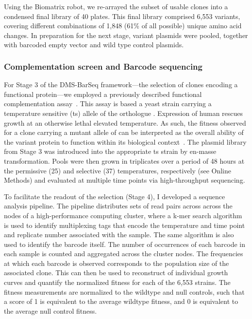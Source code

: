 Using the Biomatrix robot, we re-arrayed the subset of usable clones into a condensed final library of 40 plates. This final library comprised 6,553  variants, covering different combinations of 1,848 (61\% of all possible) unique amino acid changes. In preparation for the next stage, variant plasmids were pooled, together with barcoded empty vector and wild type control plasmids.



\subsubsection{Complementation screen and Barcode sequencing}

For Stage 3 of the DMS-BarSeq framework---the selection of clones encoding a functional protein---we employed a previously described  functional complementation assay~\cite{lee_complementation_1987,osborn_rescuing_2007}. This assay is based a yeast strain carrying a temperature sensitive (ts) allele of the  orthologue . Expression of human  rescues growth at an otherwise lethal elevated temperature. As such, the fitness observed for a clone carrying a mutant allele of  can be interpreted as the overall ability of the variant protein to function within its biological context~\cite{sun_extended_2016}. 
The plasmid library from Stage 3 was introduced into the appropriate ts strain by en-masse transformation. Pools were then grown in triplicates over a period of 48 hours at the permissive (25\celsius ) and selective (37\celsius ) temperatures, respectively (see Online Methods) and evaluated at multiple time points via high-throughput sequencing.

To facilitate the readout of the selection (Stage 4), I developed a sequence analysis pipeline. The pipeline distributes sets of read pairs across across the nodes of a high-performance computing cluster, where a k-mer search algorithm is used to identify multiplexing tags that encode the temperature and time point and replicate number associated with the sample. The same algorithm is also used to identify the barcode itself. The number of occurrences of each barcode in each sample is counted and aggregated across the cluster nodes. The frequencies at which each barcode is observed corresponds to the population size of the associated clone. This can then be used to reconstruct of individual growth curves and quantify the normalized fitness for each of the 6,553 strains. The fitness measurements are normalized to the wildtype and null controls, such that a score of 1 is equivalent to the average wildtype fitness, and 0 is equivalent to the average null control fitness.

